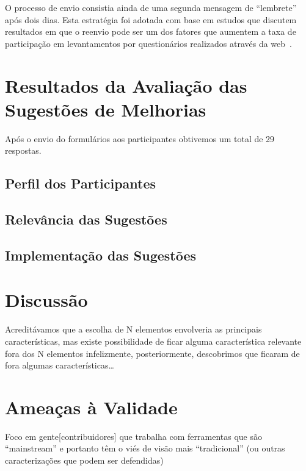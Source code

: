 O processo de envio consistia ainda de uma segunda mensagem de ``lembrete'' após
dois dias. Esta estratégia foi adotada com base em estudos que discutem
resultados em que o reenvio pode ser um dos fatores que aumentem a taxa de
participação em levantamentos por questionários realizados através da
web~\cite{fan2010factors}.

\section{Resultados da Avaliação das Sugestões de Melhorias}
\label{sec:resultados_avaliacao_sug_de_melhorias}

Após o envio do formulários aos participantes obtivemos um total de 29
respostas.

\subsection{Perfil dos Participantes}
\label{sub:sug_melhorias_resultados_perfil_dos_participantes}

\subsection{Relevância das Sugestões}
\label{sub:sug_melhorias_resultados_relevancia}

\subsection{Implementação das Sugestões}
\label{sub:sug_melhorias_resultados_implementacao}


\section{Discussão}
\label{sec:sug_melhoria_discussao}

Acreditávamos que a escolha de N elementos envolveria as principais
características, mas existe possibilidade de ficar alguma característica
relevante fora dos N elementos infelizmente, posteriormente, descobrimos que
ficaram de fora algumas características\dots

\section{Ameaças à Validade}
\label{sec:sug_melhoria_ameacas}

Foco em gente[contribuidores] que trabalha com ferramentas que são
``mainstream'' e portanto têm o viés de visão mais ``tradicional'' (ou outras
caracterizações que podem ser defendidas)

